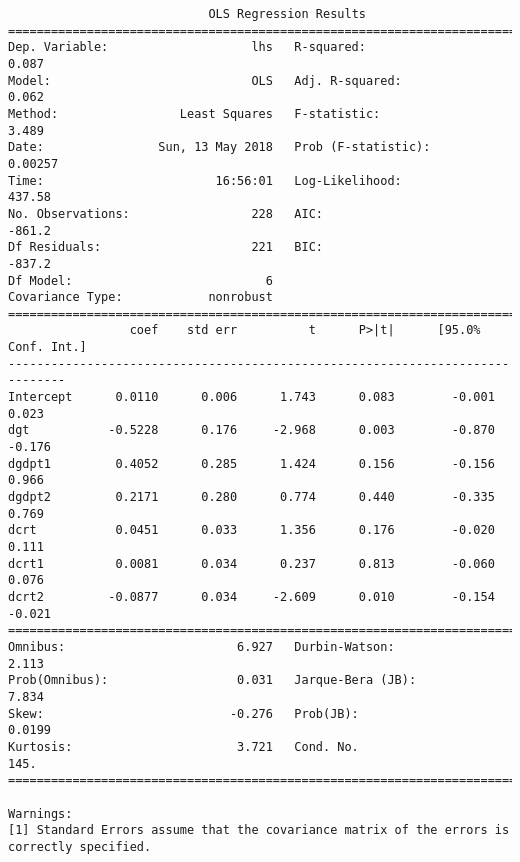 \documentclass[12pt,fleqn]{article}\usepackage{../../common}
\begin{document}
\begin{verbatim}
                            OLS Regression Results                            
==============================================================================
Dep. Variable:                    lhs   R-squared:                       0.087
Model:                            OLS   Adj. R-squared:                  0.062
Method:                 Least Squares   F-statistic:                     3.489
Date:                Sun, 13 May 2018   Prob (F-statistic):            0.00257
Time:                        16:56:01   Log-Likelihood:                 437.58
No. Observations:                 228   AIC:                            -861.2
Df Residuals:                     221   BIC:                            -837.2
Df Model:                           6                                         
Covariance Type:            nonrobust                                         
==============================================================================
                 coef    std err          t      P>|t|      [95.0% Conf. Int.]
------------------------------------------------------------------------------
Intercept      0.0110      0.006      1.743      0.083        -0.001     0.023
dgt           -0.5228      0.176     -2.968      0.003        -0.870    -0.176
dgdpt1         0.4052      0.285      1.424      0.156        -0.156     0.966
dgdpt2         0.2171      0.280      0.774      0.440        -0.335     0.769
dcrt           0.0451      0.033      1.356      0.176        -0.020     0.111
dcrt1          0.0081      0.034      0.237      0.813        -0.060     0.076
dcrt2         -0.0877      0.034     -2.609      0.010        -0.154    -0.021
==============================================================================
Omnibus:                        6.927   Durbin-Watson:                   2.113
Prob(Omnibus):                  0.031   Jarque-Bera (JB):                7.834
Skew:                          -0.276   Prob(JB):                       0.0199
Kurtosis:                       3.721   Cond. No.                         145.
==============================================================================

Warnings:
[1] Standard Errors assume that the covariance matrix of the errors is correctly specified.
\end{verbatim}
\end{document}
